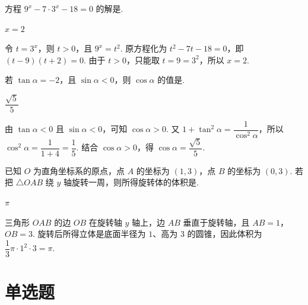 \begin{problem}

方程 \(9^{x}-7\cdot3^{x}-18=0\) 的解是\fillinblank{}.

\begin{answer}
\(x=2\)
\end{answer}
\end{problem}

\begin{solution}
令 \(t=3^x\)，则 \(t>0\)，且 \(9^x=t^2\). 原方程化为 \(t^2-7t-18=0\)，即 \((t-9)(t+2)=0\). 由于 \(t>0\)，只能取 \(t=9=3^2\)，所以 \(x=2\).
\end{solution}

\begin{problem}

若 \(\tan\alpha=-2\)，且 \(\sin\alpha<0\)，则 \(\cos\alpha\) 的值是\fillinblank{}.

\begin{answer}
\(\dfrac{\sqrt{5}}{5}\)
\end{answer}
\end{problem}

\begin{solution}
由 \(\tan\alpha<0\) 且 \(\sin\alpha<0\)，可知 \(\cos\alpha>0\). 又
\(1+\tan^2\alpha=\dfrac{1}{\cos^2\alpha}\)，所以 \(\cos^2\alpha=\dfrac{1}{1+4}=\dfrac{1}{5}\). 结合 \(\cos\alpha>0\)，得 \(\cos\alpha=\dfrac{\sqrt{5}}{5}\).
\end{solution}

\begin{problem}

已知 \(O\) 为直角坐标系的原点，点 \(A\) 的坐标为 \((1,3)\)，点 \(B\) 的坐标为 \((0,3)\). 若把 \(\triangle OAB\) 绕 \(y\) 轴旋转一周，则所得旋转体的体积是\fillinblank{}.

\begin{answer}
\(\pi\)
\end{answer}
\end{problem}

\begin{solution}
三角形 \(OAB\) 的边 \(OB\) 在旋转轴 \(y\) 轴上，边 \(AB\) 垂直于旋转轴，且 \(AB=1\)，\(OB=3\). 旋转后所得立体是底面半径为 \(1\)、高为 \(3\) 的圆锥，因此体积为 \(\dfrac{1}{3}\pi\cdot1^2\cdot3=\pi\).
\end{solution}

\section{单选题}


